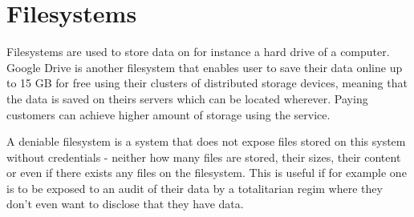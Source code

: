 \section{Filesystems}
Filesystems are used to store data on for instance a hard drive of a computer. Google Drive is another filesystem that enables user to save their data online up to 15 GB for free\cite{CloudStorageWork} using their clusters of distributed storage devices, meaning that the data is saved on theirs servers which can be located wherever\cite{DistributedStorageWhat}. Paying customers can achieve higher amount of storage using the service.

A deniable filesystem is a system that does not expose files stored on this system without credentials - neither how many files are stored, their sizes, their content or even if there exists any files on the filesystem\cite{petersDEFYDeniableFile2014}. This is useful if for example one is to be exposed to an audit of their data by a totalitarian regim where they don't even want to disclose that they have data. 